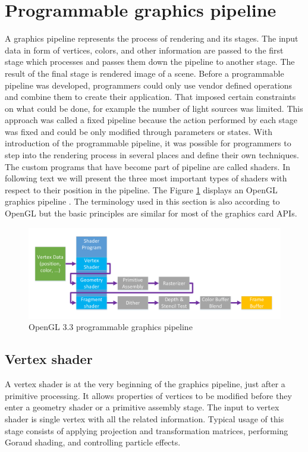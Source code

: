 \section{Programmable graphics pipeline}
\label{sec:pipeline}
A graphics pipeline represents the process of rendering and its stages. The
input data in form of vertices, colors, and other information are passed to the
first stage which processes and passes them down the pipeline to another stage.
The result of the final stage is rendered image of a scene. Before a programmable
pipeline was developed, programmers could only use vendor defined operations and
combine them to create their application. That imposed certain constraints on
what could be done, for example the number of light sources was limited. This approach
was called a fixed pipeline because the action performed by each stage was fixed and could be only modified through parameters
or states. With introduction of the programmable pipeline, it was possible for
programmers to step into the rendering process in several places and define their
own techniques. The custom programs that have become part of pipeline are called
shaders. In following text we will present the three most important types of
shaders with respect to their position in the pipeline. The Figure \ref{fig:OpenGLPipeline} displays an OpenGL graphics pipeline \cite{OpenGl}.  
The terminology used in this section is also according to OpenGL but the basic principles are similar for most of the graphics card APIs. 

\begin{figure}[htb]
	\centering
	\includegraphics[width=1\linewidth]{fig/OpenGLpipeline.pdf}
	\caption{OpenGL 3.3 programmable graphics pipeline}
	\label{fig:OpenGLPipeline}
\end{figure}

\subsection{Vertex shader}
A vertex shader is at the very beginning of the graphics pipeline, just after a primitive
processing. It allows properties of vertices to be modified before they enter a
geometry shader or a primitive assembly stage. The input to vertex shader is
single vertex with all the related information. Typical usage of this stage consists
of applying projection and transformation matrices, performing Goraud shading, and controlling particle effects.

